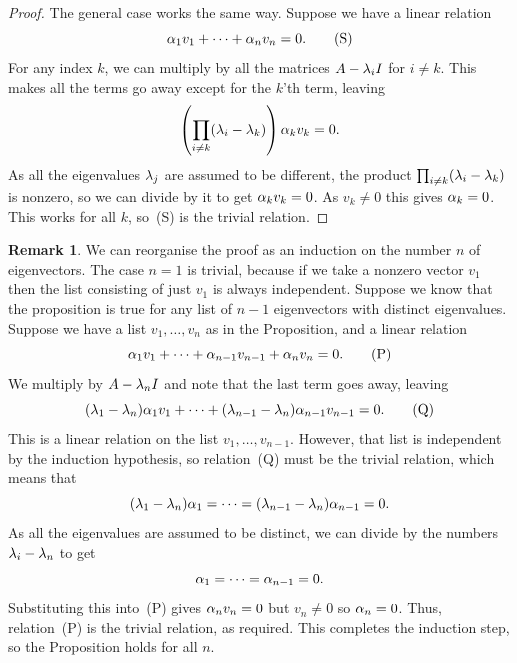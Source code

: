 \documentclass[reqno]{amsart}
\theoremstyle{definition}
\newtheorem{remark}[theorem]{Remark}
\begin{document}
\begin{proof}
 The general case works the same way.  Suppose we have a linear relation
 \[ \alpha_1v_1 + \dotsb + \alpha_nv_n = 0. \tag{S} \]
 For any index $k$, we can multiply by all the matrices $A-\lambda_iI$ for
 $i\neq k$.  This makes all the terms go away except for the $k$'th
 term, leaving
 \[ \left(\prod_{i\neq k}(\lambda_i-\lambda_k)\right) \alpha_kv_k = 0. \]
 As all the eigenvalues $\lambda_j$ are assumed to be different, the
 product $\prod_{i\neq k}(\lambda_i-\lambda_k)$ is nonzero, so we can divide
 by it to get $\alpha_kv_k=0$.  As $v_k\neq 0$ this gives $\alpha_k=0$.
 This works for all $k$, so~(S) is the trivial relation.
\end{proof}

\begin{remark}\label{rem-eigenvectors-independent}
 We can reorganise the proof as an induction on the number $n$ of
 eigenvectors.  The case $n=1$ is trivial, because if we take a
 nonzero vector $v_1$ then the list consisting of just $v_1$ is always
 independent.  Suppose we know that the proposition is true for
 any list of $n-1$ eigenvectors with distinct eigenvalues.  Suppose we
 have a list $v_1,\dotsc,v_n$ as in the Proposition, and a linear
 relation
 \[ \alpha_1v_1 + \dotsb + \alpha_{n-1}v_{n-1} + \alpha_nv_n = 0. \tag{P} \]
 We multiply by $A-\lambda_nI$ and note that the last term goes away,
 leaving
 \[ (\lambda_1-\lambda_n)\alpha_1v_1 + \dotsb +
    (\lambda_{n-1}-\lambda_n)\alpha_{n-1}v_{n-1} = 0. \tag{Q}
 \]
 This is a linear relation on the list $v_1,\dotsc,v_{n-1}$.  However,
 that list is independent by the induction hypothesis, so relation~(Q)
 must be the trivial relation, which means that
 \[ (\lambda_1-\lambda_n)\alpha_1 = \dotsb =
    (\lambda_{n-1}-\lambda_n)\alpha_{n-1} = 0.
 \]
 As all the eigenvalues are assumed to be distinct, we can divide by
 the numbers $\lambda_i-\lambda_n$ to get
 \[ \alpha_1 = \dotsb = \alpha_{n-1} = 0. \]
 Substituting this into~(P) gives $\alpha_nv_n=0$ but $v_n\neq 0$ so
 $\alpha_n=0$.  Thus, relation~(P) is the trivial relation, as required.
 This completes the induction step, so the Proposition holds for all
 $n$.
\end{remark}
\end{document}
